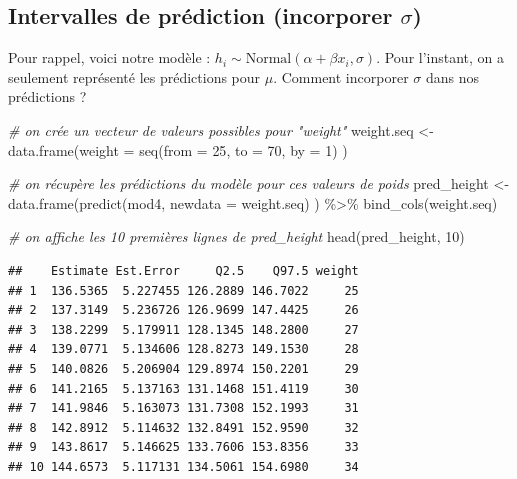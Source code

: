 \documentclass[
  a4paper,11pt,twoside,onecolumn,openright,final,oldfontcommands]{memoir}
\newenvironment{Shaded}{\begin{snugshade}}{\end{snugshade}}
\newcommand{\AttributeTok}[1]{\textcolor[rgb]{0.77,0.63,0.00}{#1}}
\newcommand{\CommentTok}[1]{\textcolor[rgb]{0.56,0.35,0.01}{\textit{#1}}}
\newcommand{\DecValTok}[1]{\textcolor[rgb]{0.00,0.00,0.81}{#1}}
\newcommand{\FunctionTok}[1]{\textcolor[rgb]{0.00,0.00,0.00}{#1}}
\newcommand{\NormalTok}[1]{#1}
\newcommand{\OtherTok}[1]{\textcolor[rgb]{0.56,0.35,0.01}{#1}}
\newcommand{\SpecialCharTok}[1]{\textcolor[rgb]{0.00,0.00,0.00}{#1}}
\theoremstyle{definition}
\theoremstyle{definition}
\theoremstyle{definition}
\theoremstyle{remark}
\begin{document}
\hypertarget{intervalles-de-pruxe9diction-incorporer-sigma}{%
\subsection{\texorpdfstring{Intervalles de prédiction (incorporer \(\sigma\))}{Intervalles de prédiction (incorporer \textbackslash sigma)}}\label{intervalles-de-pruxe9diction-incorporer-sigma}}

Pour rappel, voici notre modèle : \(h_{i} \sim \mathrm{Normal}(\alpha + \beta x_{i}, \sigma)\). Pour l'instant, on a seulement représenté les prédictions pour \(\mu\). Comment incorporer \(\sigma\) dans nos prédictions ?

\begin{Shaded}
\begin{Highlighting}[]
\CommentTok{\# on crée un vecteur de valeurs possibles pour "weight"}
\NormalTok{weight.seq }\OtherTok{\textless{}{-}} \FunctionTok{data.frame}\NormalTok{(}\AttributeTok{weight =} \FunctionTok{seq}\NormalTok{(}\AttributeTok{from =} \DecValTok{25}\NormalTok{, }\AttributeTok{to =} \DecValTok{70}\NormalTok{, }\AttributeTok{by =} \DecValTok{1}\NormalTok{) )}

\CommentTok{\# on récupère les prédictions du modèle pour ces valeurs de poids}
\NormalTok{pred\_height }\OtherTok{\textless{}{-}} \FunctionTok{data.frame}\NormalTok{(}\FunctionTok{predict}\NormalTok{(mod4, }\AttributeTok{newdata =}\NormalTok{ weight.seq) ) }\SpecialCharTok{\%\textgreater{}\%} \FunctionTok{bind\_cols}\NormalTok{(weight.seq)}

\CommentTok{\# on affiche les 10 premières lignes de pred\_height}
\FunctionTok{head}\NormalTok{(pred\_height, }\DecValTok{10}\NormalTok{)}
\end{Highlighting}
\end{Shaded}

\begin{verbatim}
##    Estimate Est.Error     Q2.5    Q97.5 weight
## 1  136.5365  5.227455 126.2889 146.7022     25
## 2  137.3149  5.236726 126.9699 147.4425     26
## 3  138.2299  5.179911 128.1345 148.2800     27
## 4  139.0771  5.134606 128.8273 149.1530     28
## 5  140.0826  5.206904 129.8974 150.2201     29
## 6  141.2165  5.137163 131.1468 151.4119     30
## 7  141.9846  5.163073 131.7308 152.1993     31
## 8  142.8912  5.114632 132.8491 152.9590     32
## 9  143.8617  5.146625 133.7606 153.8356     33
## 10 144.6573  5.117131 134.5061 154.6980     34
\end{verbatim}
\end{document}
